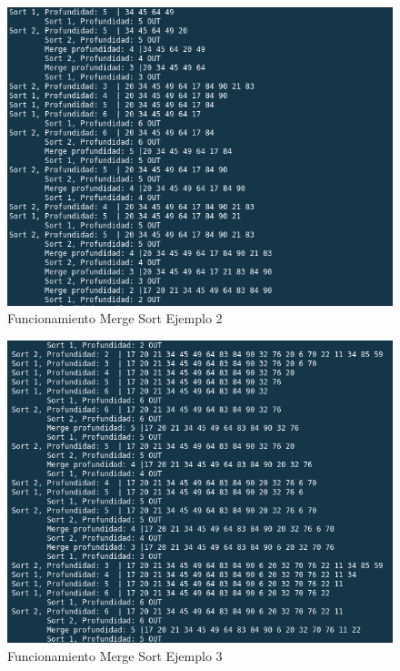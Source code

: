 \documentclass{article}
\begin{document}
		\begin{figure}[H]
			\centering
			\includegraphics[scale = 0.7]{images/e3m2.png}
			\caption{Funcionamiento Merge Sort Ejemplo 2}
		\end{figure}
	
		\begin{figure}[H]
			\centering
			\includegraphics[scale = 0.7]{images/e3m3.png}
			\caption{Funcionamiento Merge Sort Ejemplo 3}
		\end{figure}
	
\end{document}
